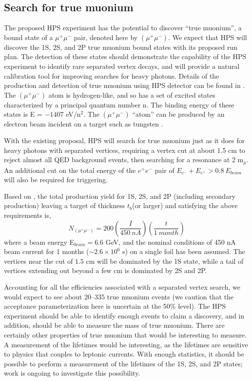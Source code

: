 \subsection{Search for true muonium}

The proposed HPS experiment has the potential to discover ``true muonium'', a bound state of a
$\mu^+ \mu^-$ pair, denoted here by $(\mu^+ \mu^-)$. 
We expect that HPS will discover the 1S, 2S, and 2P true muonium bound states with its proposed run plan. 
The detection of these states should demonstrate the capability of the HPS experiment 
to identify rare separated vertex decays, and will provide a natural calibration 
tool for improving searches for heavy photons. Details of the production and detection of true muonium using HPS detector can be found in \cite{HPS_PROP_UPD}. 
The $(\mu^+ \mu^-)$ atom is hydrogen-like, and so has a set of excited states characterized by a principal quantum number n. 
The binding energy of these states is E = $-1407$ eV/n$^2$. The $(\mu^+ \mu^-)$ ``atom'' can be produced by an electron beam incident on a target such 
as tungsten \cite{Holvik:1986ty,ArteagaRomero:2000yh}. 

With the existing proposal, HPS will search for true muonium
just as it does for heavy photons with separated vertices, requiring a vertex cut at about 1.5 cm to reject almost all
QED background events, then searching for a resonance at 2 m$_{\mu}$. An additional cut 
on the total energy of the $e^+e^-$ pair of $E_{e^-}+E_{e^+}> 0.8 \ E_{beam}$ will also be required
for triggering. 

Based on \cite{Banburski:2012tk}, the total production yield for 1S, 2S, and 2P (including secondary production)
leaving a target of thickness $t_b$(or larger) and satisfying the above requirements is,
\begin{equation}
N_{(\mu^+ \mu^-)} = 200 \left( \frac{I}{450 \ nA} \right) \left( \frac{t}{1 \ month} \right)
\end{equation}
%
where a beam energy E$_{beam} = 6.6$ GeV, and the nominal conditions
of 450 nA beam current for 1 months ($\sim 2.6 \times 10^6$ s) on a single foil has been assumed.
The vertices near the cut of $1.5$ cm will be dominated by the 1S state, while 
a tail of vertices extending out beyond a few cm is dominated by 2S and 2P. 

Accounting for all the efficiencies associated with a separated vertex search, we would expect to see about 20--335 true muonium events 
(we caution that the acceptance parameterization here is uncertain at the 50\% level).
The HPS experiment should be able to identify enough events to claim a discovery, and in addition, should be able to measure the mass of true muonium.  There are certainly other properties of true muonium that would be interesting to measure.  A measurement of the lifetimes would be interesting, as the lifetimes are sensitive to physics that couples to leptonic currents.  With enough statistics, it should be possible to perform a measurement of the lifetimes of the 1S, 2S, and 2P states; work is ongoing to investigate this possibility.  

